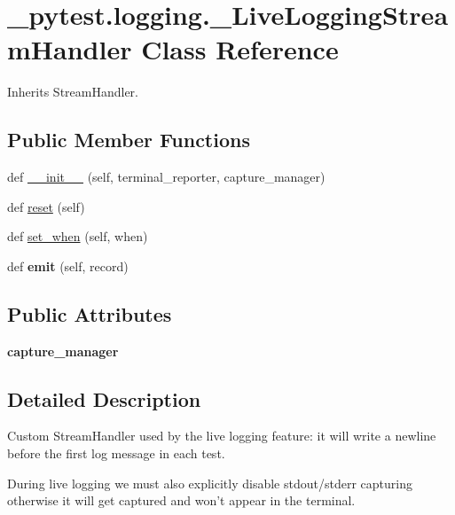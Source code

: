 \hypertarget{class__pytest_1_1logging_1_1___live_logging_stream_handler}{}\section{\+\_\+pytest.\+logging.\+\_\+\+Live\+Logging\+Stream\+Handler Class Reference}
\label{class__pytest_1_1logging_1_1___live_logging_stream_handler}


Inherits Stream\+Handler.

\subsection*{Public Member Functions}
\begin{DoxyCompactItemize}
\item 
def \hyperlink{class__pytest_1_1logging_1_1___live_logging_stream_handler_a323e33576cb884d3d93c5f8e44cb0b57}{\+\_\+\+\_\+init\+\_\+\+\_\+} (self, terminal\+\_\+reporter, capture\+\_\+manager)
\item 
def \hyperlink{class__pytest_1_1logging_1_1___live_logging_stream_handler_a7150005144dee0a36acccf875fefed04}{reset} (self)
\item 
def \hyperlink{class__pytest_1_1logging_1_1___live_logging_stream_handler_a78eaedf1bf9dec22a47f94a41730b83c}{set\+\_\+when} (self, when)
\item 
\mbox{\label{class__pytest_1_1logging_1_1___live_logging_stream_handler_ac6bea0e69e6feb5bf38c2392b9569dc5}} 
def {\bfseries emit} (self, record)
\end{DoxyCompactItemize}
\subsection*{Public Attributes}
\begin{DoxyCompactItemize}
\item 
\mbox{\label{class__pytest_1_1logging_1_1___live_logging_stream_handler_ae43bc17c2f6d1e69911dc48a1a2d428b}} 
{\bfseries capture\+\_\+manager}
\end{DoxyCompactItemize}


\subsection{Detailed Description}
\begin{DoxyVerb}Custom StreamHandler used by the live logging feature: it will write a newline before the first log message
in each test.

During live logging we must also explicitly disable stdout/stderr capturing otherwise it will get captured
and won't appear in the terminal.
\end{DoxyVerb}
 

